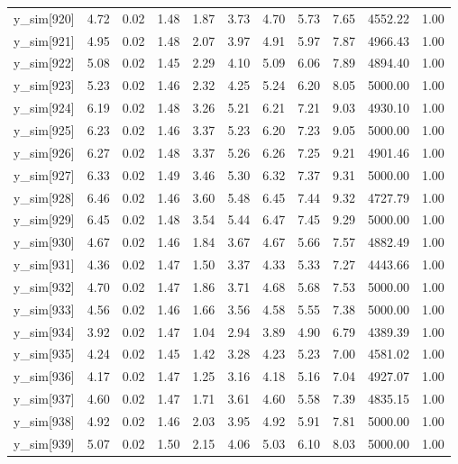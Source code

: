 \begin{table}[ht]
\begin{tabular}{rrrrrrrrrrr}
  y\_sim[920] & 4.72 & 0.02 & 1.48 & 1.87 & 3.73 & 4.70 & 5.73 & 7.65 & 4552.22 & 1.00 \\ 
  y\_sim[921] & 4.95 & 0.02 & 1.48 & 2.07 & 3.97 & 4.91 & 5.97 & 7.87 & 4966.43 & 1.00 \\ 
  y\_sim[922] & 5.08 & 0.02 & 1.45 & 2.29 & 4.10 & 5.09 & 6.06 & 7.89 & 4894.40 & 1.00 \\ 
  y\_sim[923] & 5.23 & 0.02 & 1.46 & 2.32 & 4.25 & 5.24 & 6.20 & 8.05 & 5000.00 & 1.00 \\ 
  y\_sim[924] & 6.19 & 0.02 & 1.48 & 3.26 & 5.21 & 6.21 & 7.21 & 9.03 & 4930.10 & 1.00 \\ 
  y\_sim[925] & 6.23 & 0.02 & 1.46 & 3.37 & 5.23 & 6.20 & 7.23 & 9.05 & 5000.00 & 1.00 \\ 
  y\_sim[926] & 6.27 & 0.02 & 1.48 & 3.37 & 5.26 & 6.26 & 7.25 & 9.21 & 4901.46 & 1.00 \\ 
  y\_sim[927] & 6.33 & 0.02 & 1.49 & 3.46 & 5.30 & 6.32 & 7.37 & 9.31 & 5000.00 & 1.00 \\ 
  y\_sim[928] & 6.46 & 0.02 & 1.46 & 3.60 & 5.48 & 6.45 & 7.44 & 9.32 & 4727.79 & 1.00 \\ 
  y\_sim[929] & 6.45 & 0.02 & 1.48 & 3.54 & 5.44 & 6.47 & 7.45 & 9.29 & 5000.00 & 1.00 \\ 
  y\_sim[930] & 4.67 & 0.02 & 1.46 & 1.84 & 3.67 & 4.67 & 5.66 & 7.57 & 4882.49 & 1.00 \\ 
  y\_sim[931] & 4.36 & 0.02 & 1.47 & 1.50 & 3.37 & 4.33 & 5.33 & 7.27 & 4443.66 & 1.00 \\ 
  y\_sim[932] & 4.70 & 0.02 & 1.47 & 1.86 & 3.71 & 4.68 & 5.68 & 7.53 & 5000.00 & 1.00 \\ 
  y\_sim[933] & 4.56 & 0.02 & 1.46 & 1.66 & 3.56 & 4.58 & 5.55 & 7.38 & 5000.00 & 1.00 \\ 
  y\_sim[934] & 3.92 & 0.02 & 1.47 & 1.04 & 2.94 & 3.89 & 4.90 & 6.79 & 4389.39 & 1.00 \\ 
  y\_sim[935] & 4.24 & 0.02 & 1.45 & 1.42 & 3.28 & 4.23 & 5.23 & 7.00 & 4581.02 & 1.00 \\ 
  y\_sim[936] & 4.17 & 0.02 & 1.47 & 1.25 & 3.16 & 4.18 & 5.16 & 7.04 & 4927.07 & 1.00 \\ 
  y\_sim[937] & 4.60 & 0.02 & 1.47 & 1.71 & 3.61 & 4.60 & 5.58 & 7.39 & 4835.15 & 1.00 \\ 
  y\_sim[938] & 4.92 & 0.02 & 1.46 & 2.03 & 3.95 & 4.92 & 5.91 & 7.81 & 5000.00 & 1.00 \\ 
  y\_sim[939] & 5.07 & 0.02 & 1.50 & 2.15 & 4.06 & 5.03 & 6.10 & 8.03 & 5000.00 & 1.00 \\ 

\end{tabular}
\end{table}
